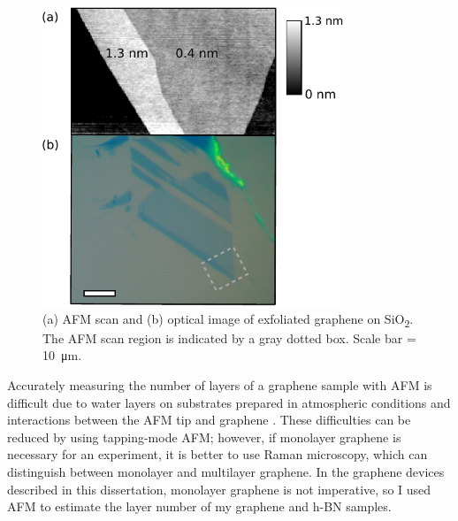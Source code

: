 \documentclass[double,12pt,1in,seploa]{beavtex}
\begin{document}
\begin{figure}
    \centering
    \includegraphics[width = 9cm]{graphene layer comparison.pdf}
    \caption{(a) AFM scan and (b) optical image of exfoliated graphene on SiO\textsubscript{2}. The AFM scan region is indicated by a gray dotted box. Scale bar = \SI{10}{\micro\meter}.}
    \label{fig:graphenelayer}
\end{figure}
Accurately measuring the number of layers of a graphene sample with AFM is difficult due to water layers on substrates prepared in atmospheric conditions and interactions between the AFM tip and graphene \cite{shearer_accurate_2016}. These difficulties can be reduced by using tapping-mode AFM; however, if monolayer graphene is necessary for an experiment, it is better to use Raman microscopy, which can distinguish between monolayer and multilayer graphene. In the graphene devices described in this dissertation, monolayer graphene is not imperative, so I used AFM to estimate the layer number of my graphene and h-BN samples.
\end{document}
